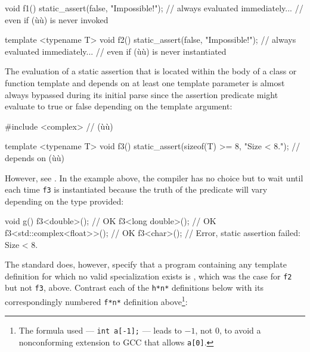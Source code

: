 \begin{emcppslisting}[emcppserrorlines={3,9}]
void f1()
{
    static_assert(false, "Impossible!");  // always evaluated immediately...
}                                         // even if (ù{}ù) is never invoked

template <typename T>
void f2()
{
    static_assert(false, "Impossible!");  // always evaluated immediately...
}                                         // even if (ù{}ù) is never instantiated
\end{emcppslisting}

\noindent The evaluation of a static assertion that is located within the
body of a class or function template and depends on at least one
template parameter is almost always bypassed during its initial parse since
the assertion predicate might evaluate to true or false depending on the template argument:

\begin{emcppshiddenlisting}[emcppsbatch=e2]
#include <complex>  // (ù{}ù)
\end{emcppshiddenlisting}
\begin{emcppslisting}[emcppsbatch=e2]
template <typename T>
void f3()
{
    static_assert(sizeof(T) >= 8, "Size < 8.");  // depends on (ù{}ù)
}
\end{emcppslisting}

\noindent However, see
.
In the example above, the compiler has no choice but to wait until each
time \lstinline!f3! is instantiated because the truth of the predicate will
vary depending on the type provided:

\begin{emcppslisting}[emcppsbatch=e2]
void g()
{
    f3<double>();               // OK
    f3<long double>();          // OK
    f3<std::complex<float>>();  // OK
    f3<char>();                 // Error, static assertion failed: Size < 8.
}
\end{emcppslisting}

\noindent The standard does, however, specify that a program containing any
template definition for which no valid specialization exists is
, which was the case for
\lstinline!f2! but not \lstinline!f3!, above. Contrast each of the
\lstinline!h*!\lstinline[basicstyle=\ttfamily\itshape]!n!\lstinline!*! definitions below with its correspondingly numbered
\lstinline!f*!\lstinline[basicstyle=\ttfamily\itshape]!n!\lstinline!*!  definition above\footnote{The formula used --- \lstinline!int!~\lstinline!a[-1];! --- leads to $-1$, not $0$, to avoid a nonconforming extension to GCC that allows \lstinline!a[0]!.}:

